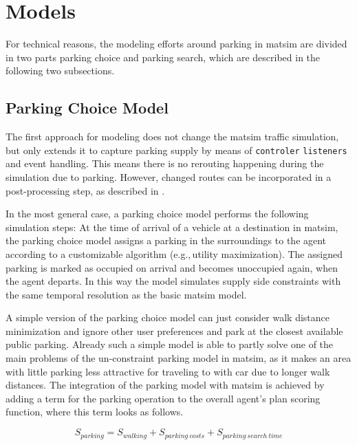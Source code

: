 \section{Models}
For technical reasons, the modeling efforts around parking in \gls{matsim} are divided in two parts parking choice and parking search, which are described in the following two subsections. 

\subsection{Parking Choice Model}
The first approach for modeling does not change the \gls{matsim} traffic simulation, but only extends it to capture parking supply by means of \lstinline|controler| \lstinline|listeners| and event handling. This means there is no rerouting happening during the simulation due to parking. However, changed routes can be incorporated in a post-processing step, as described in \citet[][]{WaraichAxhausen_TRR_2012}. 

In the most general case, a parking choice model performs the following simulation steps: At the time of arrival of a vehicle at a destination in \gls{matsim}, the parking choice model assigns a parking in the surroundings to the agent according to a customizable algorithm (e.g.,\,utility maximization). The assigned parking is marked as occupied on arrival and becomes unoccupied again, when the agent departs. In this way the model simulates supply side constraints with the same temporal resolution as the basic \gls{matsim} model.

A simple version of the parking choice model can just consider walk distance minimization and ignore other user preferences and park at the closest available public parking. Already such a simple model is able to partly solve one of the main problems of the un-constraint parking model in \gls{matsim}, as it makes an area with little parking less attractive for traveling to with car due to longer walk distances. The integration of the parking model with \gls{matsim} is achieved by adding a term for the parking operation to the overall agent’s plan scoring function, where this term looks as follows.

\begin{equation}
\label{eq:parkingutf}
S_{parking} = S_{walking} + S_{parking\ costs} + S_{parking\ search\ time}
\end{equation}


